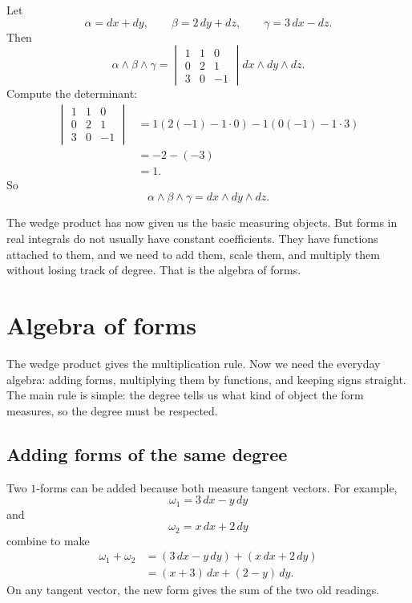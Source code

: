 \begin{example}
Let
\[
    \alpha=dx+dy,
    \qquad
    \beta=2\,dy+dz,
    \qquad
    \gamma=3\,dx-dz.
\]
Then
\[
    \alpha\wedge\beta\wedge\gamma
    =
    \begin{vmatrix}
        1&1&0\\
        0&2&1\\
        3&0&-1
    \end{vmatrix}
    dx\wedge dy\wedge dz.
\]
Compute the determinant:
\[
\begin{aligned}
    \begin{vmatrix}
        1&1&0\\
        0&2&1\\
        3&0&-1
    \end{vmatrix}
    &=
    1(2(-1)-1\cdot0)
    -
    1(0(-1)-1\cdot3)\\
    &=
    -2-(-3)\\
    &=
    1.
\end{aligned}
\]
So
\[
\boxed{
    \alpha\wedge\beta\wedge\gamma
    =
    dx\wedge dy\wedge dz.
}
\]
\end{example}

The wedge product has now given us the basic measuring objects.  But forms in real
integrals do not usually have constant coefficients.  They have functions attached to
them, and we need to add them, scale them, and multiply them without losing track of
degree.  That is the algebra of forms.

\section{Algebra of forms}
\label{sec:16.4}

The wedge product gives the multiplication rule.  Now we need the everyday algebra:
adding forms, multiplying them by functions, and keeping signs straight.  The main
rule is simple: the degree tells us what kind of object the form measures, so the degree
must be respected.

\subsection{Adding forms of the same degree}

Two \(1\)-forms can be added because both measure tangent vectors.  For example,
\[
    \omega_1=3\,dx-y\,dy
\]
and
\[
    \omega_2=x\,dx+2\,dy
\]
combine to make
\[
\begin{aligned}
    \omega_1+\omega_2
    &=
    (3\,dx-y\,dy)+(x\,dx+2\,dy)\\
    &=
    (x+3)\,dx+(2-y)\,dy.
\end{aligned}
\]
On any tangent vector, the new form gives the sum of the two old readings.

